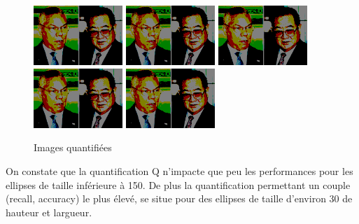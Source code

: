 \documentclass[a4paper,12pt, openany]{book}
\theoremstyle{break}
\begin{document}
\begin{figure}[H]
\centering
\includegraphics[width=0.3\textwidth]{images/quantified_test2.png}\hfill
\includegraphics[width=0.3\textwidth]{images/quantified_test2.png}\hfill
\includegraphics[width=0.3\textwidth]{images/quantified_test2.png}\hfill
\includegraphics[width=0.3\textwidth]{images/quantified_test2.png}\hfill
\includegraphics[width=0.3\textwidth]{images/quantified_test2.png}\vfill

\caption{Images quantifiées}
\end{figure}

On constate que la quantification Q n'impacte que peu les performances pour les ellipses de taille inférieure à 150. De plus la quantification permettant un couple (recall, accuracy) le plus élevé, se situe pour des ellipses de taille d'environ 30 de hauteur et largueur.
\end{document}
